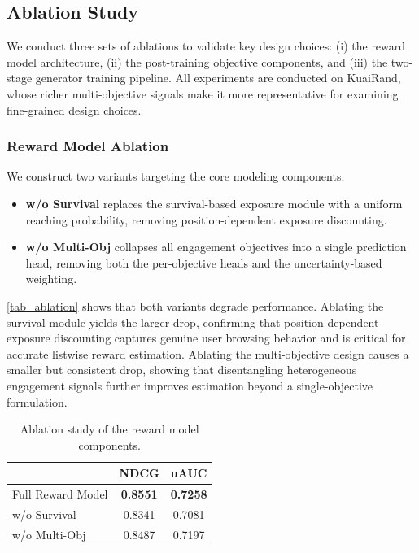 \documentclass[sigconf]{acmart}
\begin{document}
\subsection{Ablation Study}
We conduct three sets of ablations to validate key design choices: (i) the reward model architecture, (ii) the post-training objective components, and (iii) the two-stage generator training pipeline. All experiments are conducted on KuaiRand, whose richer multi-objective signals make it more representative for examining fine-grained design choices.

\subsubsection{Reward Model Ablation}
We construct two variants targeting the core modeling components:
\begin{itemize}
    \item \textbf{w/o Survival} replaces the survival-based exposure module with a uniform reaching probability, removing position-dependent exposure discounting.
    \item \textbf{w/o Multi-Obj} collapses all engagement objectives into a single prediction head, removing both the per-objective heads and the uncertainty-based weighting.
\end{itemize}
\autoref{tab_ablation} shows that both variants degrade performance. Ablating the survival module yields the larger drop, confirming that position-dependent exposure discounting captures genuine user browsing behavior and is critical for accurate listwise reward estimation. Ablating the multi-objective design causes a smaller but consistent drop, showing that disentangling heterogeneous engagement signals further improves estimation beyond a single-objective formulation.

\begin{table}[htpb]
\caption{Ablation study of the reward model components.}
\label{tab_ablation}
\begin{tabular}{lcc}
\toprule
                  & NDCG            & uAUC            \\
\midrule
Full Reward Model & \textbf{0.8551} & \textbf{0.7258} \\
\midrule
w/o Survival      & 0.8341          & 0.7081          \\
w/o Multi-Obj     & 0.8487          & 0.7197          \\
\bottomrule
\end{tabular}
\end{table}
\end{document}
